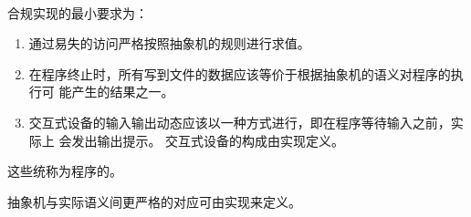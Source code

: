 \paragraph{} %
合规实现的最小要求为：
\begin{enumerate}
  \item 通过易失\glvalue{}的访问严格按照抽象机的规则进行求值。
  \item 在程序终止时，所有写到文件的数据应该等价于根据抽象机的语义对程序的执行可
        能产生的结果之一。
  \item 交互式设备的输入输出动态应该以一种方式进行，即在程序等待输入之前，实际上
        会发出输出提示。 交互式设备的构成由实现定义。
\end{enumerate}
这些统称为程序的。

\begin{note}
抽象机与实际语义间更严格的对应可由实现来定义。
\end{note}
